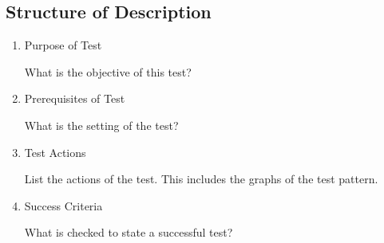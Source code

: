 \documentclass[12pt,a4paper]{report}
\begin{document}
\subsection{Structure of Description}
\begin{enumerate}
	\item Purpose of Test

	What is the objective of this test?
	\item Prerequisites of Test

	What is the setting of the test?
	\item Test Actions

	List the actions of the test. This includes the graphs of the test pattern.
	\item Success Criteria

	What is checked to state a successful test?
\end{enumerate}
\end{document}
